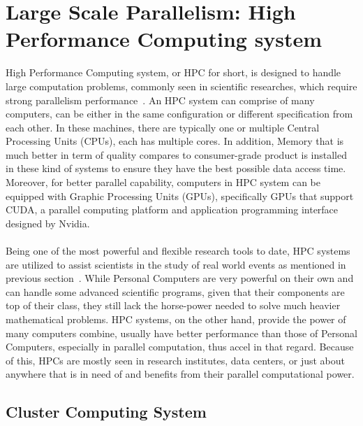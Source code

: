 \section{Large Scale Parallelism: High Performance Computing system}
High Performance Computing system, or HPC for short, is designed to handle large computation problems, commonly seen in scientific researches, which require strong parallelism performance~\cite{hpc_status}. An HPC system can comprise of many computers, can be either in the same configuration or different specification from each other. In these machines, there are typically one or multiple Central Processing Units (CPUs), each has multiple cores. In addition, Memory that is much better in term of quality compares to consumer-grade product is installed in these kind of systems to ensure they have the best possible data access time. Moreover, for better parallel capability, computers in HPC system can be equipped with Graphic Processing Units (GPUs), specifically GPUs that support CUDA, a parallel computing platform and application programming interface designed by Nvidia. \\
~\\
Being one of the most powerful and flexible research tools to date, HPC systems are utilized to assist scientists in the study of real world events as mentioned in previous section~\cite{hpc_status}. While Personal Computers are very powerful on their own and can handle some advanced scientific programs, given that their components are top of their class, they still lack the horse-power needed to solve much heavier mathematical problems. HPC systems, on the other hand, provide the power of many computers combine, usually have better performance than those of Personal Computers, especially in parallel computation, thus accel in that regard. Because of this, HPCs are mostly seen in research institutes, data centers, or just about anywhere that is in need of and benefits from their parallel computational power. \\

\subsection{Cluster Computing System}

